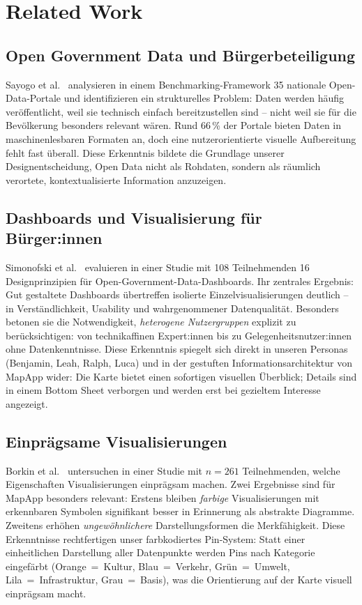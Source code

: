 \section{Related Work}

\subsection{Open Government Data und Bürgerbeteiligung}

Sayogo et al.\ \cite{open_gov} analysieren in einem Benchmarking-Framework
35 nationale Open-Data-Portale und identifizieren ein strukturelles Problem:
Daten werden häufig veröffentlicht, weil sie technisch einfach bereitzustellen sind –
nicht weil sie für die Bevölkerung besonders relevant wären.
Rund 66\,\% der Portale bieten Daten in maschinenlesbaren Formaten an,
doch eine nutzerorientierte visuelle Aufbereitung fehlt fast überall.
Diese Erkenntnis bildete die Grundlage unserer Designentscheidung,
Open Data nicht als Rohdaten, sondern als räumlich verortete,
kontextualisierte Information anzuzeigen.

\subsection{Dashboards und Visualisierung für Bürger:innen}

Simonofski et al.\ \cite{simonofski2022} evaluieren in einer Studie mit
108 Teilnehmenden 16 Designprinzipien für Open-Government-Data-Dashboards.
Ihr zentrales Ergebnis: Gut gestaltete Dashboards übertreffen isolierte
Einzelvisualisierungen deutlich – in Verständlichkeit, Usability und
wahrgenommener Datenqualität.
Besonders betonen sie die Notwendigkeit, \emph{heterogene Nutzergruppen}
explizit zu berücksichtigen: von technikaffinen Expert:innen bis zu
Gelegenheitsnutzer:innen ohne Datenkenntnisse.
Diese Erkenntnis spiegelt sich direkt in unseren Personas (Benjamin, Leah,
Ralph, Luca) und in der gestuften Informationsarchitektur von MapApp wider:
Die Karte bietet einen sofortigen visuellen Überblick;
Details sind in einem Bottom Sheet verborgen und werden erst bei
gezieltem Interesse angezeigt.

\subsection{Einprägsame Visualisierungen}

Borkin et al.\ \cite{Visualization} untersuchen in einer Studie
mit $n = 261$ Teilnehmenden, welche Eigenschaften Visualisierungen
einprägsam machen.
Zwei Ergebnisse sind für MapApp besonders relevant:
Erstens bleiben \emph{farbige} Visualisierungen mit erkennbaren Symbolen
signifikant besser in Erinnerung als abstrakte Diagramme.
Zweitens erhöhen \emph{ungewöhnlichere} Darstellungsformen die Merkfähigkeit.
Diese Erkenntnisse rechtfertigen unser farbkodiertes Pin-System:
Statt einer einheitlichen Darstellung aller Datenpunkte werden Pins nach
Kategorie eingefärbt (Orange~=~Kultur, Blau~=~Verkehr, Grün~=~Umwelt,
Lila~=~Infrastruktur, Grau~=~Basis), was die Orientierung auf der Karte
visuell einprägsam macht.

